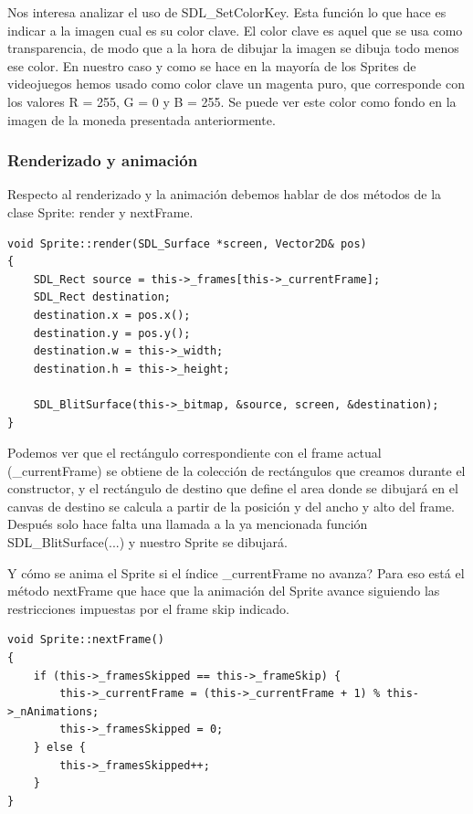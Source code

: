 \documentclass[parskip=half*]{scrartcl}
\begin{document}
			Nos interesa analizar el uso de SDL\_SetColorKey. Esta funci\'on lo que hace es indicar a la imagen cual es su color clave. El color clave es aquel que se usa como transparencia, de modo que a la hora de dibujar la imagen se dibuja todo menos ese color. En nuestro caso y como se hace en la mayor\'ia de los Sprites de videojuegos hemos usado como color clave un magenta puro, que corresponde con los valores R = 255, G = 0 y B = 255. Se puede ver este color como fondo en la imagen de la moneda presentada anteriormente.

		\subsubsection{Renderizado y animaci\'on}
			Respecto al renderizado y la animaci\'on debemos hablar de dos m\'etodos de la clase Sprite: render y nextFrame.

			\begin{verbatim}
void Sprite::render(SDL_Surface *screen, Vector2D& pos)
{
    SDL_Rect source = this->_frames[this->_currentFrame];
    SDL_Rect destination;
    destination.x = pos.x();
    destination.y = pos.y();
    destination.w = this->_width;
    destination.h = this->_height;
    
    SDL_BlitSurface(this->_bitmap, &source, screen, &destination);
}
			\end{verbatim}

			Podemos ver que el rect\'angulo correspondiente con el frame actual (\_currentFrame) se obtiene de la colecci\'on de rect\'angulos que creamos durante el constructor, y el rect\'angulo de destino que define el area donde se dibujar\'a en el canvas de destino se calcula a partir de la posici\'on y del ancho y alto del frame. Despu\'es solo hace falta una llamada a la ya mencionada funci\'on SDL\_BlitSurface(...) y nuestro Sprite se dibujar\'a.

			\textquestiondown Y c\'omo se anima el Sprite si el \'indice \_currentFrame no avanza? Para eso est\'a el m\'etodo nextFrame que hace que la animaci\'on del Sprite avance siguiendo las restricciones impuestas por el frame skip indicado.

			\begin{verbatim}
void Sprite::nextFrame()
{
    if (this->_framesSkipped == this->_frameSkip) {
        this->_currentFrame = (this->_currentFrame + 1) % this->_nAnimations;
        this->_framesSkipped = 0;
    } else {
        this->_framesSkipped++;
    }
}
			\end{verbatim}
\end{document}
